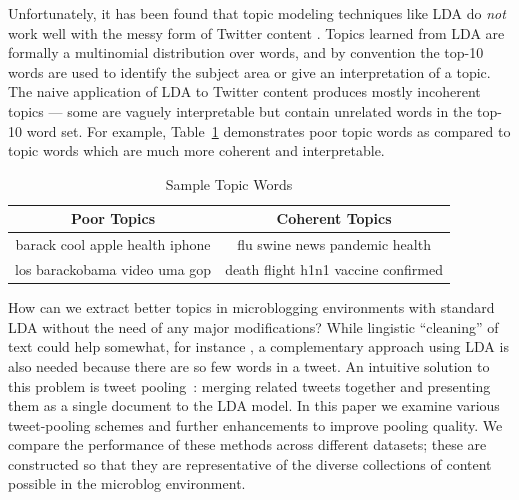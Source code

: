 \documentclass{sig-alternate}
\begin{document}
Unfortunately, it has been found that topic modeling techniques like
LDA do \emph{not} work well with the messy form of Twitter content
\cite{wayne}.  Topics learned from LDA are formally a multinomial
distribution over words, and by convention the top-10 words are used
to identify the subject area or give an interpretation of a topic.
The naive application of LDA to Twitter content produces mostly
incoherent topics --- some are vaguely interpretable but contain
unrelated words in the top-10 word set.  For example,
Table~\ref{tbl-0} demonstrates poor topic words as compared to topic
words which are much more coherent and interpretable.

\begin{table}[!h]
\centering
\resizebox{8.5cm}{!} 
{
	\begin{tabular}{|c|c|}
	\hline
        Poor Topics  & Coherent Topics \\
\hline
 {\small barack cool apple health iphone}
 &
 {\small flu swine news pandemic health}\\
 {\small los barackobama video uma gop} & {\small death flight h1n1 vaccine confirmed} \\
 \hline
	\end{tabular}
}
\caption{Sample Topic Words}\label{tbl-0}
\end{table}


How can we extract better topics in
microblogging environments with standard LDA without the need of any
major modifications?  
While lingistic ``cleaning'' of text could help somewhat,
for instance  \cite{Han2012},  a complementary approach 
using LDA is also needed because there are so few words in a tweet.
An intuitive solution to this problem is tweet
pooling~\cite{Weng2010wsdm,hong}: merging related tweets together and presenting them as a
single document to the LDA model.  
In this paper we examine various tweet-pooling schemes and further 
enhancements to improve pooling quality.  We compare
the performance of these methods across different datasets; these are
constructed so that they are representative of the diverse collections
of content possible in the microblog environment.  
\end{document}
